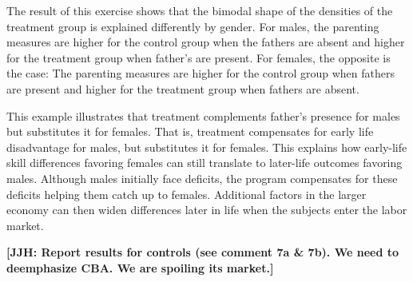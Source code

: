 The result of this exercise shows that the bimodal shape of the densities of the treatment group is explained differently by gender. For males, the parenting measures are higher for the control group when the fathers are absent and higher for the treatment group when father's are present. For females, the opposite is the case: The parenting measures are higher for the control group when fathers are present and higher for the treatment group when fathers are absent.

This example illustrates that treatment complements father's presence for males but substitutes it for females. That is, treatment compensates for early life disadvantage for males, but substitutes it for females. This explains how early-life skill differences favoring females can still translate to later-life outcomes favoring males. Although males initially face deficits, the program compensates for these deficits helping them catch up to females. Additional factors in the larger economy can then widen differences later in life when the subjects enter the labor market.

\textbf{[JJH: Report results for controls (see comment 7a \& 7b). We need to deemphasize CBA. We are spoiling its market.]}


